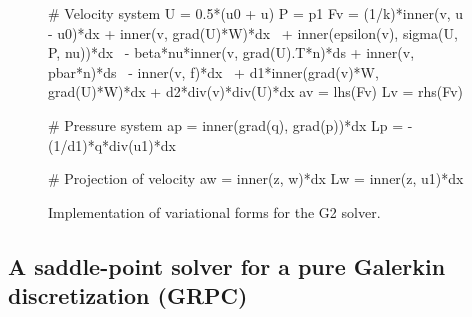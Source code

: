 \begin{figure}
  \begin{center}
    \begin{python}
# Velocity system
U = 0.5*(u0 + u)
P = p1
Fv = (1/k)*inner(v, u - u0)*dx + inner(v, grad(U)*W)*dx \
   + inner(epsilon(v), sigma(U, P, nu))*dx \
   - beta*nu*inner(v, grad(U).T*n)*ds + inner(v, pbar*n)*ds \
   - inner(v, f)*dx \
   + d1*inner(grad(v)*W, grad(U)*W)*dx + d2*div(v)*div(U)*dx
av = lhs(Fv)
Lv = rhs(Fv)

# Pressure system
ap = inner(grad(q), grad(p))*dx
Lp = -(1/d1)*q*div(u1)*dx

# Projection of velocity
aw = inner(z, w)*dx
Lw = inner(z, u1)*dx
    \end{python}
    \caption{Implementation of variational forms for the G2 solver.}
    \label{fig:g2_code}
  \end{center}
\end{figure}

\subsection{A saddle-point solver for a pure Galerkin discretization (GRPC)}

